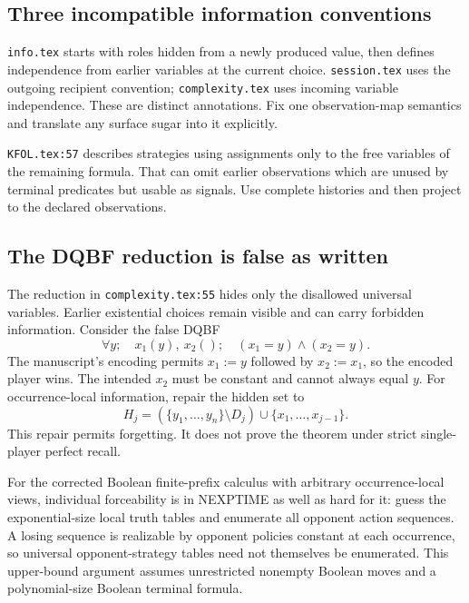 \documentclass[11pt]{article}
\begin{document}
\subsection{Three incompatible information conventions}

\texttt{info.tex} starts with roles hidden from a newly produced value, then
defines independence from earlier variables at the current choice.
\texttt{session.tex} uses the outgoing recipient convention;
\texttt{complexity.tex} uses incoming variable independence. These are distinct
annotations. Fix one observation-map semantics and translate any surface sugar
into it explicitly.

\texttt{KFOL.tex:57} describes strategies using assignments only to the free
variables of the remaining formula. That can omit earlier observations which
are unused by terminal predicates but usable as signals. Use complete histories
and then project to the declared observations.

\subsection{The DQBF reduction is false as written}

The reduction in \texttt{complexity.tex:55} hides only the disallowed universal
variables. Earlier existential choices remain visible and can carry forbidden
information. Consider the false DQBF
\[
 \forall y;\quad x_1(y),\ x_2();\quad
 (x_1=y)\land(x_2=y).
\]
The manuscript's encoding permits $x_1:=y$ followed by $x_2:=x_1$, so the encoded
player wins. The intended $x_2$ must be constant and cannot always equal $y$.
For occurrence-local information, repair the hidden set to
\[
 H_j=(\{y_1,\ldots,y_n\}\setminus D_j)
            \cup\{x_1,\ldots,x_{j-1}\}.
 \tag{9}
\]
This repair permits forgetting. It does not prove the theorem under strict
single-player perfect recall.

For the corrected Boolean finite-prefix calculus with arbitrary occurrence-local
views, individual forceability is in NEXPTIME as well as hard for it: guess the
exponential-size local truth tables and enumerate all opponent action sequences.
A losing sequence is realizable by opponent policies constant at each occurrence,
so universal opponent-strategy tables need not themselves be enumerated.
This upper-bound argument assumes unrestricted nonempty Boolean moves and a
polynomial-size Boolean terminal formula.
\end{document}
